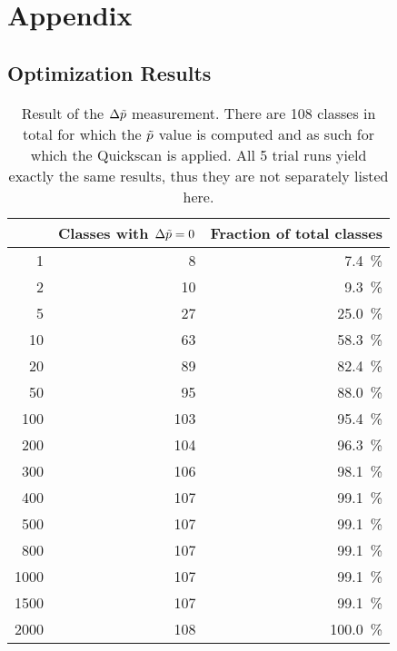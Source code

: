 

\renewcommand\thechapter{A}
\chapter*{Appendix}

\section*{Optimization Results}

\begin{table}[htbp]
	\centering
	\begin{tabular}{| r | r || r | }
		\hline
		\paramregions & Classes with $\Delta \tilde{p} = 0$ & Fraction of total classes \\
		
		\hline \hline
		
\num{1} & \num{8} & \SI{7.4}{\percent} \\ 
\num{2} & \num{10} & \SI{9.3}{\percent} \\ 
\num{5} & \num{27} & \SI{25.0}{\percent} \\ 
\num{10} & \num{63} & \SI{58.3}{\percent} \\ 
\num{20} & \num{89} & \SI{82.4}{\percent} \\ 
\num{50} & \num{95} & \SI{88.0}{\percent} \\ 
\num{100} & \num{103} & \SI{95.4}{\percent} \\ 
\num{200} & \num{104} & \SI{96.3}{\percent} \\ 
\num{300} & \num{106} & \SI{98.1}{\percent} \\ 
\num{400} & \num{107} & \SI{99.1}{\percent} \\ 
\num{500} & \num{107} & \SI{99.1}{\percent} \\ 
\num{800} & \num{107} & \SI{99.1}{\percent} \\ 
\num{1000} & \num{107} & \SI{99.1}{\percent} \\ 
\num{1500} & \num{107} & \SI{99.1}{\percent} \\ 
\num{2000} & \num{108} & \SI{100.0}{\percent} \\ 

		\hline
	\end{tabular}
	\caption{Result of the $\Delta \tilde{p}$ measurement. There are 108 classes in total for which the $\tilde{p}$ value is computed and as such for which the Quickscan is applied. All 5 trial runs yield exactly the same results, thus they are not separately listed here.}
	\label{tbl:deltaptilde_results}
\end{table}

